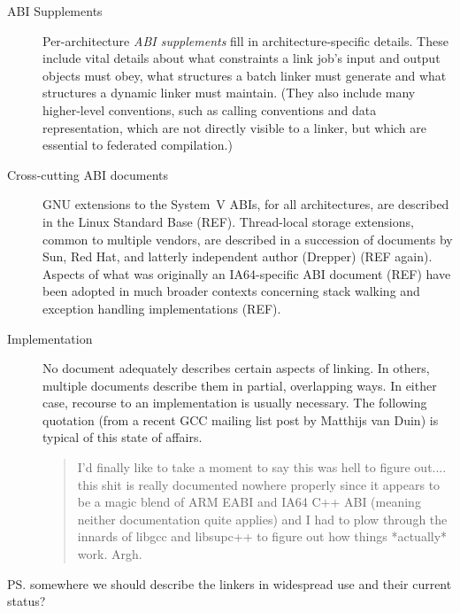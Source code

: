 \begin{description}
\item[ABI Supplements] Per-architecture \emph{ABI supplements} fill in architecture-specific
details. These include vital details about 
what constraints a link job's input and output objects 
must obey, what structures a batch linker must generate
and what structures a dynamic linker must maintain.
(They also include many higher-level conventions, such as calling conventions
and data representation, which are not directly visible to a linker, but 
which are essential to federated compilation.)

\item[Cross-cutting ABI documents] GNU extensions to the System~V ABIs, for all
architectures, are described in the Linux Standard Base (REF). Thread-local storage
extensions, common to multiple vendors, are described in a succession of documents by Sun,
Red Hat, and latterly independent author (Drepper) (REF again).
Aspects of what was originally an IA64-specific \Cplusplus{} ABI document (REF)
have been adopted in much broader contexts concerning stack walking
and exception handling implementations (REF).

\item[Implementation] No document adequately describes certain aspects of linking.
In others, multiple documents describe them in partial, overlapping ways.
In either case, recourse to an implementation is usually necessary.
The following quotation (from a recent GCC mailing list post by Matthijs van Duin)
is typical of this state of affairs.

{\footnotesize\begin{quotation}
I'd finally like to take a moment to say this was hell to figure
out.... this shit is really documented nowhere properly since it
appears to be a magic blend of ARM EABI and IA64 C++ ABI (meaning
neither documentation quite applies) and I had to plow through the
innards of libgcc and libsupc++ to figure out how things *actually*
work. Argh.
\end{quotation}}

\end{description}


\ps{somewhere we should describe the linkers in widespread use and
  their current status?}

% 
% 
% 
% 
% 


